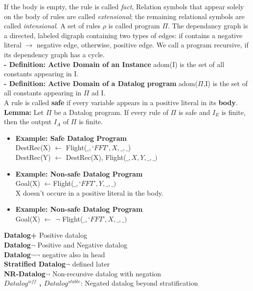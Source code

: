 \documentclass{article}
\begin{document}
If the body is empty, the rule is called \textit{fact}, Relation symbols that appear solely on the body of rules are called \textit{extensional}; the remaining relational symbols are called \textit{intensional}. A set of rules $\rho$ is called program $\Pi$. The dependancy graph is a directed, labeled digraph containing two types of edges: if contains a negative literal $\rightarrow$ negative edge, otherwise, positive edge. We call a program recursive, if its dependency graph has a cycle.\\
\textbf{- Definition: Active Domain of an Instance} adom(I) is the set of all constants appearing in I.\\
\textbf{- Definition: Active Domain of a Datalog program} adom($\Pi$,I) is the set of all constants appearing in $\Pi$ ad I.\\
A rule is called \textbf{safe }if every variable appears in a positive literal in its \textbf{body}.\\
\textbf{Lemma: }Let $\Pi$ be a Datalog program. If every rule of $\Pi$ is safe and $I_E$ is finite, then the output $I_A$ of $\Pi$ is finite.
\begin{itemize}
\item \textbf{Example: Safe Datalog Program}\\
DestRec(X) $\leftarrow$ Flight($\_,‘FFT’,X,\_,\_$)\\
DestRec(Y) $\leftarrow$ DestRec(X), Flight($\_,X,Y,\_,\_)$
\item \textbf{Example: Non-safe Datalog Program}\\
Goal(X) $\leftarrow $Flight($\_,‘FFT’,Y,\_,\_)$\\
X doesn't occure in a positive literal in the body.
\item \textbf{Example: Non-safe Datalog Program}\\
Goal(X) $\leftarrow$ $\neg$ Flight($\_,‘FFT’,X,\_,\_)$
\end{itemize}
\textbf{Datalog+} Positive datalog\\
\textbf{Datalog$\neg$} Positive and Negative datalog\\
\textbf{Datalog$\neg\neg$} negative also in head\\
\textbf{Stratified Datalog$\neg$} defined later\\
\textbf{NR-Datalog$\neg$} Non-recursive datalog with negation\\
\textbf{$Datalog^{wff}$ , $Datalog^{stable}$}: Negated datalog beyond stratification\\\\
\end{document}
